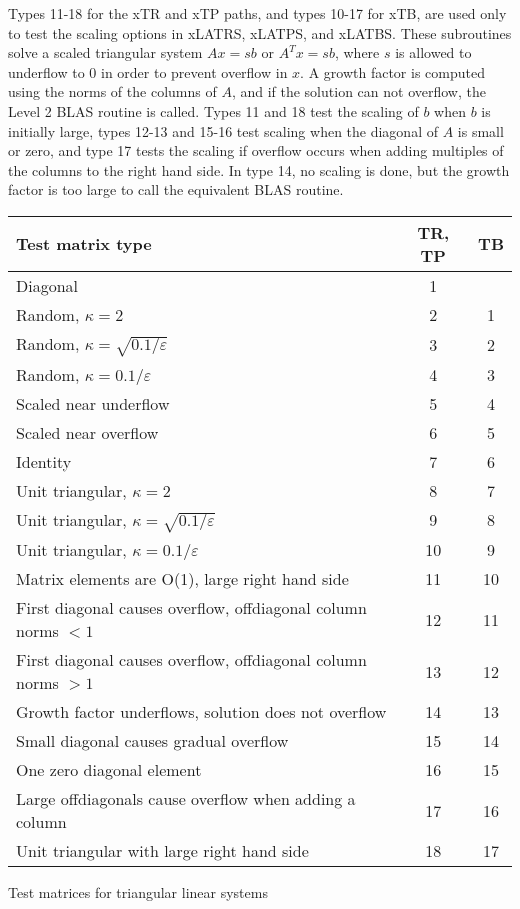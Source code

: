 Types 11-18 for the xTR and xTP paths, and types 10-17 for xTB, are
used only to test the scaling options in xLATRS, xLATPS, and xLATBS.
These subroutines solve a scaled triangular system $Ax = sb$ or
$A^T x = sb$, where $s$ is allowed to underflow to $0$
in order to prevent overflow in $x$.
A growth factor is computed using the norms of the columns of $A$, and
if the solution can not overflow, the Level 2 BLAS routine is called.
Types 11 and 18 test the scaling of $b$ when $b$ is initially large,
types 12-13 and 15-16 test scaling when the diagonal of $A$ is small
or zero, and type 17 tests the scaling if overflow occurs when adding
multiples of the columns to the right hand side.
In type 14, no scaling is done, but the growth factor is too large
to call the equivalent BLAS routine.

\TS
\begin{tabular}{|l||c|c|} \hline
Test matrix type  & TR, TP & TB \\ \hline
Diagonal & 1 &  \\
Random, $\kappa = 2$ & 2 & 1 \\
Random, $\kappa = \sqrt{0.1/\varepsilon}$ & 3 & 2 \\
Random, $\kappa = 0.1/\varepsilon$ & 4 & 3 \\
Scaled near underflow & 5 & 4 \\
Scaled near overflow & 6 & 5 \\
Identity  & 7 & 6 \\
Unit triangular, $\kappa = 2$ & 8 & 7 \\
Unit triangular, $\kappa = \sqrt{0.1/\varepsilon}$ & 9 & 8 \\
Unit triangular, $\kappa = 0.1/\varepsilon$ & 10 &  9  \\
Matrix elements are O(1), large right hand side & 11 & 10 \\
First diagonal causes overflow, offdiagonal column norms $< 1$ & 12 & 11 \\
First diagonal causes overflow, offdiagonal column norms $> 1$ & 13 & 12 \\
Growth factor underflows, solution does not overflow & 14 & 13 \\
Small diagonal causes gradual overflow & 15 & 14 \\
One zero diagonal element & 16 & 15 \\
Large offdiagonals cause overflow when adding a column & 17 & 16 \\
Unit triangular with large right hand side & 18 & 17  \\ \hline
\end{tabular} 
\caption{Test matrices for triangular linear systems}
\label{testmat:TRI}
\TE


